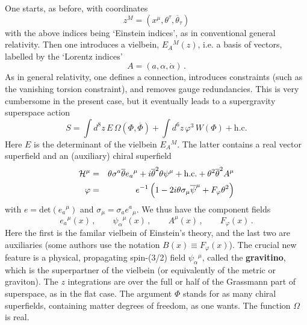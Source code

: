 \documentclass[12pt]{article}
\newcommand{\be}{\begin{equation}}
\newcommand{\ee}{\end{equation}}
\newcommand{\bea}{\begin{eqnarray}}
\newcommand{\eea}{\end{eqnarray}}
\newcommand{\ol}{\overline}
\numberwithin{equation}{section}
\begin{document}
One starts, as before, with coordinates 
\be
z^M=(x^\mu,\theta^\tau,\ol{\theta}_{\dot{\tau}})
\ee
with the above indices being `Einstein indices', as in conventional general relativity. Then one introduces a vielbein, $E_A{}^M(z)$, i.e. a basis of vectors, labelled by the `Lorentz indices'
\be
A=(a,\alpha,\dot{\alpha})\,.
\ee
As in general relativity, one defines a connection, introduces constraints (such as the vanishing torsion constraint), and removes gauge redundancies. This is very cumbersome in the present case, but it eventually leads to a supergravity superspace action
\be
S=\int d^8z \,E\, \Omega(\Phi,\ol{\Phi})+\int d^6 z\, \varphi^3\, W(\Phi)+ \mbox{h.c.}
\ee
Here $E$ is the determinant of the vielbein $E_A{}^M$. The latter contains a real vector superfield and an (auxiliary) chiral superfield \cite{bk}
\bea
{\cal H}^\mu&=&\theta\sigma^a\ol{\theta}e_a{}^\mu+ i\ol{\theta}^2\theta\psi^\mu + \mbox{h.c.} + \theta^2\ol{\theta}^2 A^\mu
\\
\varphi&=& e^{-1}\left(1-2i\theta\sigma_\mu\ol{\psi}^\mu+F_\varphi\theta^2\right)
\eea
with $e=\mbox{det}(e_a{}^\mu)$ and $\sigma_\mu = \sigma_a e^a{}_\mu$. We thus have the component fields
\be
e_a{}^\mu(x)\,,\qquad \psi_\alpha{}^\mu(x)\,,\qquad A^\mu(x)\,,\qquad  F_\varphi(x)\,.
\ee
Here the first is the familar vielbein of Einstein's theory, and the last two are auxiliaries (some authors use the notation $B(x)\equiv F_\varphi(x)$). The crucial new feature is a physical, propagating spin-(3/2) field $\psi_\alpha{}^\mu$, called the {\bf gravitino}, which is the superpartner of the vielbein (or equivalently of the metric or graviton). The $z$ integrations are over the full or half of the Grassmann part of superspace, as in the flat case. The argument $\Phi$ stands for as many chiral superfields, containing matter degrees of freedom, as one wants. The function $\Omega$ is real. 
\end{document}
